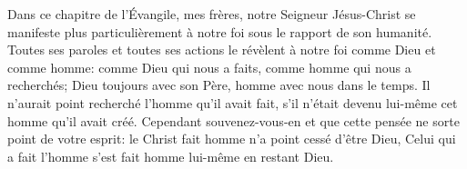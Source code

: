 Dans ce chapitre de l’Évangile, mes frères,
	notre Seigneur Jésus-Christ se manifeste plus particulièrement à notre foi
	sous le rapport de son humanité.
Toutes ses paroles et toutes ses actions le révèlent à notre foi
		comme Dieu et comme homme:
	comme Dieu qui nous a faits, comme homme qui nous a recherchés;
	Dieu toujours avec son Père, homme avec nous dans le temps.
Il n’aurait point recherché l’homme qu’il avait fait,
	s’il n’était devenu lui-même cet homme qu’il avait créé.
Cependant souvenez-vous-en et que cette pensée ne sorte point de votre esprit:
	le Christ fait homme n’a point cessé d’être Dieu,
	Celui qui a fait l’homme s’est fait homme lui-même en restant Dieu.
